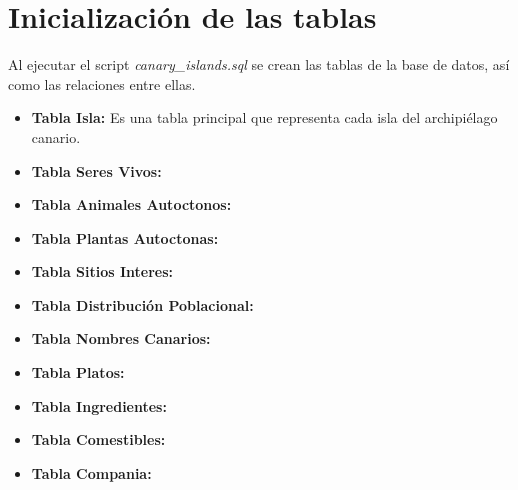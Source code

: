 \documentclass[11pt]{report}
\begin{document}
\section{Inicialización de las tablas}
Al ejecutar el script \emph{canary\_islands.sql} se crean las tablas de la base de datos, así como las relaciones entre ellas.
\begin{itemize}
    \item \textbf{Tabla Isla:} Es una tabla principal que representa cada isla del archipiélago canario.
    \lstset{style=mystyle}
    

    \item \textbf{Tabla Seres Vivos:} 
    \lstset{style=mystyle}
    

    \item \textbf{Tabla Animales Autoctonos:} 
    \lstset{style=mystyle}
    

    \item \textbf{Tabla Plantas Autoctonas:}
    \lstset{style=mystyle}
    

    \item \textbf{Tabla Sitios Interes:}
    \lstset{style=mystyle}
    

    \item \textbf{Tabla Distribución Poblacional:} 
    \lstset{style=mystyle}
    

    \item \textbf{Tabla Nombres Canarios:}
    \lstset{style=mystyle}
    

    \item \textbf{Tabla Platos:}
    \lstset{style=mystyle}
    

    \item \textbf{Tabla Ingredientes:}
    \lstset{style=mystyle}
    

    \item \textbf{Tabla Comestibles:}
    \lstset{style=mystyle}
    

    \item \textbf{Tabla Compania:}
    \lstset{style=mystyle}
    


\end{itemize}
\end{document}
